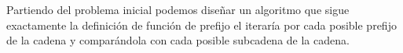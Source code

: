 Partiendo del problema inicial podemos diseñar un algoritmo que sigue exactamente la definición de función de prefijo el iteraría por cada posible prefijo de la cadena y comparándola con cada posible subcadena de la cadena.